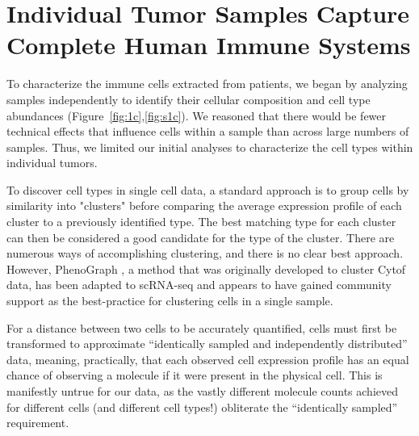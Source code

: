 \section{Individual Tumor Samples Capture Complete Human Immune Systems}

To characterize the immune cells extracted from patients, we began by analyzing samples independently to identify their cellular composition and cell type abundances (Figure~\ref{fig:1c},\ref{fig:s1c}).
We reasoned that there would be fewer technical effects that influence cells within a sample than across large numbers of samples. 
Thus, we limited our initial analyses to characterize the cell types within individual tumors. 

To discover cell types in single cell data, a standard approach is to group cells by similarity into "clusters" before comparing the average expression profile of each cluster to a previously identified type.
The best matching type for each cluster can then be considered a good candidate for the type of the cluster. 
There are numerous ways of accomplishing clustering, and there is no clear best approach. 
However, PhenoGraph \citep{Levine2015}, a method that was originally developed to cluster Cytof data, has been adapted to scRNA-seq and appears to have gained community support as the best-practice for clustering cells in a single sample\cite{Shekhar2016,Butler2017}. 

For a distance between two cells to be accurately quantified, cells must first be transformed to approximate ``identically sampled and independently distributed'' data, meaning, practically, that each observed cell expression profile has an equal chance of observing a molecule if it were present in the physical cell. 
This is manifestly untrue for our data, as the vastly different molecule counts achieved for different cells (and different cell types!) obliterate the ``identically sampled'' requirement. %

